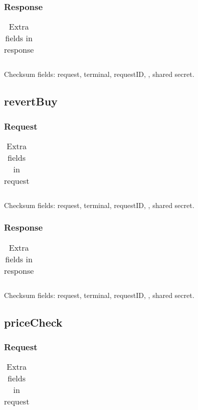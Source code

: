 \documentclass[a4paper,11pt]{article}
\newcommand{\code}[1]
   {\textsf{#1}}
\begin{document}
\subsubsection{Response}
\begin{table}[!h]
  \begin{tabular}{|l|l|}
    \hline
       \\\hline
  \end{tabular} 
  \caption{Extra fields in \code{} response}
\end{table}

Checksum fields: request, terminal, requestID, , shared secret.


\subsection{revertBuy}

\subsubsection{Request}
\begin{table}[!h]
  \begin{tabular}{|l|l|}
    \hline
       \\\hline
  \end{tabular} 
  \caption{Extra fields in \code{} request}
\end{table}

Checksum fields: request, terminal, requestID, , shared secret.

\subsubsection{Response}
\begin{table}[!h]
  \begin{tabular}{|l|l|}
    \hline
       \\\hline
  \end{tabular} 
  \caption{Extra fields in \code{} response}
\end{table}

Checksum fields: request, terminal, requestID, , shared secret.


\subsection{priceCheck}

\subsubsection{Request}
\begin{table}[!h]
  \begin{tabular}{|l|l|}
    \hline
       \\\hline
  \end{tabular} 
  \caption{Extra fields in \code{} request}
\end{table}
\end{document}
